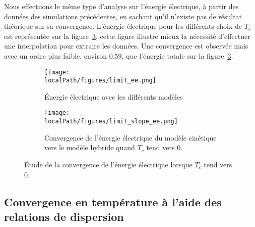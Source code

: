 Nous effectuons le même type d'analyse sur l'énergie électrique, à partir des données des simulations précédentes, en sachant qu'il n'existe pas de résultat théorique sur sa convergence. L'énergie électrique pour les différents choix de $T_c$ est représentée sur la figure~\ref{fig:limit:ee}, cette figure illustre mieux la nécessité d'effectuer une interpolation pour extraire les données. Une convergence est observée mais avec un ordre plus faible, environ $0.59$, que l'énergie totale sur la figure~\ref{fig:limit:ee}.
\begin{figure}[h]
  \centering
  \begin{subfigure}{0.45\textwidth}
    \centering
    \texttt{[image: \\localPath/figures/limit\_ee.png]}
    \caption{Énergie électrique avec les différents modèles}
    \label{fig:limit:ee:ee}
  \end{subfigure}
  \begin{subfigure}{0.45\textwidth}
    \centering
    \texttt{[image: \\localPath/figures/limit\_slope\_ee.png]}
    \caption{Convergence de l'énergie électrique du modèle cinétique vers le modèle hybride quand $T_c$ tend vers $0$.}
    \label{fig:limit:ee:slope}
  \end{subfigure}
  \caption{Étude de la convergence de l'énergie électrique lorsque $T_c$ tend vers 0.}
  \label{fig:limit:ee}
\end{figure}

\subsection{Convergence en température à l'aide des relations de dispersion}

